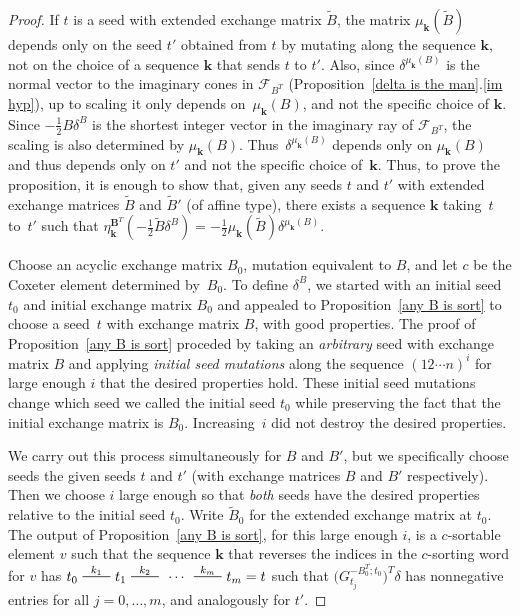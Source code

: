 \documentclass{amsart}
\theoremstyle{definition}
\theoremstyle{remark}
\numberwithin{equation}{section}
\newcommand{\edge}{\,\,\rule[2.7pt]{20pt}{0.5pt}\,\,}
\newcommand{\F}{{\mathcal F}}
\newcommand{\0}{{\mathbf{0}}}
\newcommand{\kk}{{\boldsymbol{k}}}
\newcommand{\tB}{{\tilde{B}}}
\newcommand{\BB}{\mathbf{B}}
\begin{document}
\begin{proof}%
If $t$ is a seed with extended exchange matrix $\tB$, the matrix $\mu_\kk(\tB)$ depends only on the seed $t'$ obtained from $t$ by mutating along the sequence $\kk$, not on the choice of a sequence $\kk$ that sends $t$ to $t'$.
Also, since $\delta^{\mu_\kk(B)}$ is the normal vector to the imaginary cones in $\F_{B^T}$ (Proposition~\ref{delta is the man}.\ref{im hyp}), up to scaling it only depends on~$\mu_\kk(B)$, and not the specific choice of $\kk$.
Since $-\frac12B\delta^B$ is the shortest integer vector in the imaginary ray of $\F_{B^T}$, the scaling is also determined by $\mu_\kk(B)$.
Thus~$\delta^{\mu_\kk(B)}$ depends only on $\mu_\kk(B)$ and thus depends only on $t'$ and not the specific choice of~$\kk$.
Thus, to prove the proposition, it is enough to show that, given any seeds $t$ and $t'$ with extended exchange matrices $\tB$ and $\tB'$ (of affine type), there exists a sequence $\kk$ taking~$t$ to~$t'$ such that $\eta^{\BB^T}_\kk(-\frac12\tB\delta^B)=-\frac12\mu_\kk(\tB)\delta^{\mu_\kk(B)}$.

Choose an acyclic exchange matrix $B_0$, mutation equivalent to $B$, and let $c$ be the Coxeter element determined by~$B_0$.
To define $\delta^B$, we started with an initial seed~$t_0$ and initial exchange matrix $B_0$ and appealed to Proposition~\ref{any B is sort} to choose a seed~$t$ with exchange matrix $B$, with good properties.
The proof of Proposition~\ref{any B is sort} proceded by taking an \emph{arbitrary} seed with exchange matrix $B$ and applying \emph{initial seed mutations} along the sequence $(12\cdots n)^i$ for large enough $i$ that the desired properties hold. 
These initial seed mutations change which seed we called the initial seed $t_0$ while preserving the fact that the initial exchange matrix is $B_0$.
Increasing~$i$ did not destroy the desired properties.

We carry out this process simultaneously for $B$ and $B'$, but we specifically choose seeds the given seeds $t$ and $t'$ (with exchange matrices $B$ and $B'$ respectively).
Then we choose $i$ large enough so that \emph{both} seeds have the desired properties relative to the initial seed $t_0$.
Write $\tB_0$ for the extended exchange matrix at $t_0$.
The output of Proposition~\ref{any B is sort}, for this large enough $i$, is a $c$-sortable element $v$ such that the sequence $\kk$ that reverses the indices in the $c$-sorting word for $v$ has ${t_0\overset{k_1}{\edge}t_1\overset{k_2}{\edge}\,\cdots\,\overset{k_m}{\edge}t_m=t}$ such that $\bigl(G_{t_j}^{-B_0^T;t_0}\bigr)^T\delta$ has nonnegative entries for all ${j=0,\ldots,m}$, and analogously for $t'$.


\end{proof}
\end{document}
